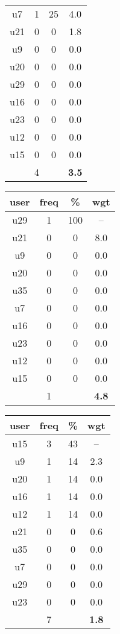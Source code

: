 \begin{appendices}
\begin{table}
\begin{tabular}{ |c|c|c|c| }
	u7 & 1 & 25 & 4.0 \\
	u21 & 0 & 0 & 1.8 \\
	u9 & 0 & 0 & 0.0 \\
	u20 & 0 & 0 & 0.0 \\
	u29 & 0 & 0 & 0.0 \\
	u16 & 0 & 0 & 0.0 \\
	u23 & 0 & 0 & 0.0 \\
	u12 & 0 & 0 & 0.0 \\
	u15 & 0 & 0 & 0.0 \\
	 & 4 & & \textbf{3.5} \\
	\hline
\end{tabular}
\begin{tabular}{ |c|c|c|c| }
	\hline
	\textbf{user} & \textbf{freq} & \textbf{\%} & \textbf{wgt} \\
	\hline
	u29 & 1 & 100 & -- \\
	u21 & 0 & 0 & 8.0 \\
	u9 & 0 & 0 & 0.0 \\
	u20 & 0 & 0 & 0.0 \\
	u35 & 0 & 0 & 0.0 \\
	u7 & 0 & 0 & 0.0 \\
	u16 & 0 & 0 & 0.0 \\
	u23 & 0 & 0 & 0.0 \\
	u12 & 0 & 0 & 0.0 \\
	u15 & 0 & 0 & 0.0 \\
	 & 1 & & \textbf{4.8} \\
	\hline
\end{tabular}
\begin{tabular}{ |c|c|c|c| }
	\hline
	\textbf{user} & \textbf{freq} & \textbf{\%} & \textbf{wgt} \\
	\hline
	u15 & 3 & 43 & -- \\
	u9 & 1 & 14 & 2.3 \\
	u20 & 1 & 14 & 0.0 \\
	u16 & 1 & 14 & 0.0 \\
	u12 & 1 & 14 & 0.0 \\
	u21 & 0 & 0 & 0.6 \\
	u35 & 0 & 0 & 0.0 \\
	u7 & 0 & 0 & 0.0 \\
	u29 & 0 & 0 & 0.0 \\
	u23 & 0 & 0 & 0.0 \\
	 & 7 & & \textbf{1.8} \\
	\hline
\end{tabular}

\end{table}
\end{appendices}
